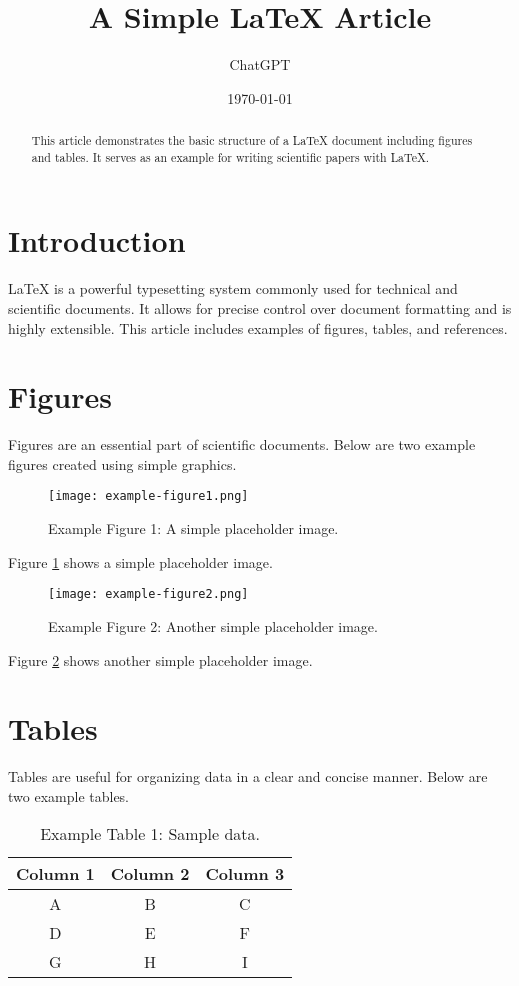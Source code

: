 \documentclass{article}
\title{A Simple LaTeX Article}
\author{ChatGPT}
\date{\today}
\begin{document}
\maketitle

\begin{abstract}
This article demonstrates the basic structure of a LaTeX document including figures and tables. It serves as an example for writing scientific papers with LaTeX.
\end{abstract}

\section{Introduction}
LaTeX is a powerful typesetting system commonly used for technical and scientific documents. It allows for precise control over document formatting and is highly extensible. This article includes examples of figures, tables, and references.

\section{Figures}
Figures are an essential part of scientific documents. Below are two example figures created using simple graphics.

\begin{figure}[H]
\centering
\texttt{[image: example-figure1.png]}
\caption{Example Figure 1: A simple placeholder image.}
\label{fig:example1}
\end{figure}

Figure \ref{fig:example1} shows a simple placeholder image.

\begin{figure}[H]
\centering
\texttt{[image: example-figure2.png]}
\caption{Example Figure 2: Another simple placeholder image.}
\label{fig:example2}
\end{figure}

Figure \ref{fig:example2} shows another simple placeholder image.

\section{Tables}
Tables are useful for organizing data in a clear and concise manner. Below are two example tables.

\begin{table}[H]
\centering
\caption{Example Table 1: Sample data.}
\begin{tabular}{|c|c|c|}
\hline
\textbf{Column 1} & \textbf{Column 2} & \textbf{Column 3} \\
\hline
A & B & C \\
\hline
D & E & F \\
\hline
G & H & I \\
\hline
\end{tabular}
\label{tab:example1}
\end{table}
\end{document}
